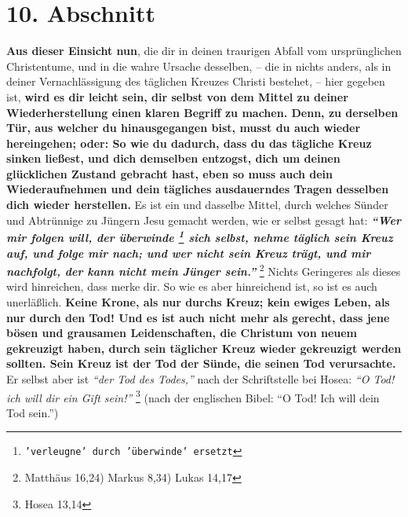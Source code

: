 \section{10. Abschnitt}  \label{kap2_ab10}

\textbf{Aus dieser Einsicht nun}, die dir in deinen traurigen Abfall vom
ursprünglichen
Christentume, und in die wahre Ursache desselben, -- die in nichts anders, als
in deiner Vernachlässigung des täglichen Kreuzes Christi bestehet, -- hier
gegeben ist, \textbf{wird es dir leicht sein, dir selbst von dem Mittel zu
deiner
Wiederherstellung einen klaren Begriff zu machen. Denn, zu derselben Tür, aus
welcher du hinausgegangen bist, musst du auch wieder hereingehen; oder: So wie du
dadurch, dass du das tägliche Kreuz sinken ließest, und dich demselben entzogst,
dich um deinen glücklichen Zustand gebracht hast, eben so muss auch dein
Wiederaufnehmen und dein tägliches ausdauerndes Tragen desselben dich wieder
herstellen.} Es ist ein und dasselbe Mittel, durch welches Sünder und Abtrünnige
zu Jüngern Jesu gemacht werden, wie er selbst gesagt hat:
\textbf{\textit{"`Wer mir
folgen will, der überwinde
\footnote{\texttt{'verleugne' durch 'überwinde' ersetzt}}
sich selbst, nehme täglich sein Kreuz auf, und folge
mir nach; und wer nicht sein Kreuz trägt, und mir nachfolgt, der kann nicht mein
Jünger sein."'}}
\footnote{Matthäus 16,24) Markus 8,34) Lukas 14,17}
 Nichts
Geringeres als dieses wird hinreichen, dass merke dir. So wie es aber hinreichend
ist, so ist es auch unerläßlich. \textbf{Keine Krone, als nur durchs Kreuz;
kein ewiges Leben, als nur durch den Tod!
Und es ist auch nicht mehr als gerecht, dass jene
bösen und grausamen Leidenschaften, die Christum von neuem gekreuzigt haben,
durch sein täglicher Kreuz wieder gekreuzigt werden sollten. Sein Kreuz ist der
Tod der Sünde, die seinen Tod verursachte.} Er selbst aber ist
\textit{"`der Tod des Todes,"'} nach der Schriftstelle bei Hosea:
\textit{"`O Tod! ich will dir ein Gift sein!"'}
\footnote{Hosea 13,14}
 (nach der englischen Bibel: "`O Tod! Ich will
dein
Tod sein."')


